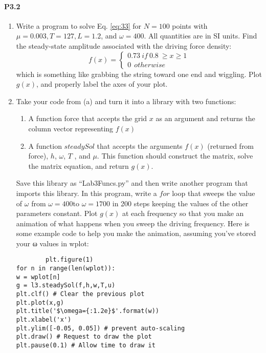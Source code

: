 \paragraph*{P3.2}
\begin{enumerate}[label=(\alph*)]
	\item Write a program to solve Eq. \eqref{eq:33} for $N = 100$ points with $ \mu = 0.003,
T = 127, L = 1.2$, and $\omega = 400$. All quantities are in SI units. Find the
steady-state amplitude associated with the driving force density:
\begin{equation}\label{eq:34}
		f(x) = 
		\begin{cases}
		0.73 \ if \ 0.8 \	\geq x 	\geq 1 \\
		0 \ \ otherwise
		\end{cases}
				\end{equation}which is something like grabbing the string toward one end and wiggling. Plot $g(x)$, and properly label the axes of your plot.
				\item Take your code from (a) and turn it into a library with two functions:
				\begin{enumerate}
				\item	A function force that accepts the grid $x$ as an argument and
returns the column vector representing $f(x)$

\item A function $steadySol$ that accepts the arguments $f(x)$ (returned
from force), $h$, $\omega$, $T$ , and $\mu$. This function should construct the
matrix, solve the matrix equation, and return $g(x)$.
\end{enumerate}

Save this library as “Lab3Funcs.py” and then write another program
that imports this library. In this program, write a $for$ loop that sweeps
the value of $\omega$ from $\omega = 400$to $\omega = 1700$ in 200 steps keeping the
values of the other parameters constant. Plot $g(x)$ at each frequency
so that you make an animation of what happens when you sweep the
driving frequency. Here is some example code to help you make the
animation, assuming you\rq ve stored your ω values in wplot:
		\begin{lstlisting}
		plt.figure(1)
for n in range(len(wplot)):
w = wplot[n]
g = l3.steadySol(f,h,w,T,u)
plt.clf() # Clear the previous plot
plt.plot(x,g)
plt.title('$\omega={:1.2e}$'.format(w))
plt.xlabel('x')
plt.ylim([-0.05, 0.05]) # prevent auto-scaling
plt.draw() # Request to draw the plot
plt.pause(0.1) # Allow time to draw it
		

\end{lstlisting}
\end{enumerate}
